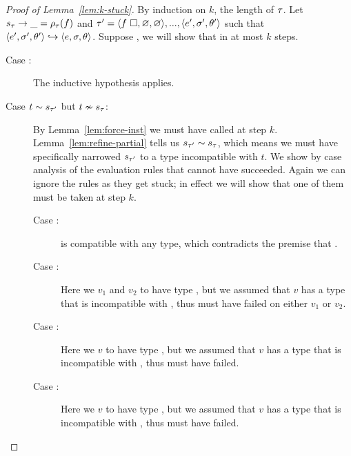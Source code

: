 \begin{proof}[Proof of Lemma~\ref{lem:k-stuck}]
  By induction on $k$, the length of $\tau$. Let $s_{\tau} \rightarrow \_ = \rho_{\tau}(f)$ and
  $\tau' = \langle f\ \square{}, \varnothing, \varnothing \rangle,...,\langle e', \sigma', \theta' \rangle$
  such that $\langle e', \sigma', \theta' \rangle \hookrightarrow \langle e, \sigma, \theta \rangle$.
  Suppose , we
  will show that 
  in at most $k$ steps.

  \begin{description}
  \item [Case :]
    The inductive hypothesis applies.
  \item [Case $t \sim s_{\tau'}$ but $t \nsim s_{\tau}$:]
    By Lemma~\ref{lem:force-inst} we must have called \forcesym at step
    $k$.
    Lemma~\ref{lem:refine-partial} tells us
    $s_{\tau'} \sim s_{\tau}$, which means we must have
    specifically narrowed $s_{\tau'}$ to a type incompatible with $t$.
    We show by case analysis of the evaluation rules that \forcesym
    cannot have succeeded. Again we can ignore the 
    rules as they get stuck; in effect we will show that one of them
    must be taken at step $k$.
    \begin{description}
    \item[Case \reholegood:] \thole is compatible with any type, which
      contradicts the premise that .
    \item[Case \replusgood:] Here we \forcesym $v_1$ and $v_2$ to have type
      \tint, but we assumed that $v$ has a type that is incompatible with
      \tint, thus \forcesym must have failed on either $v_1$ or $v_2$.
    \item[Case :] Here we \forcesym $v$ to have type
      \tbool, but we assumed that $v$ has a type that is incompatible with
      \tbool, thus \forcesym must have failed.
    \item[Case \reappgood:] Here we \forcesym $v$ to have type
      \tfun, but we assumed that $v$ has a type that is incompatible with
      \tfun, thus \forcesym must have failed.

\end{description}
\end{description}
\end{proof}
